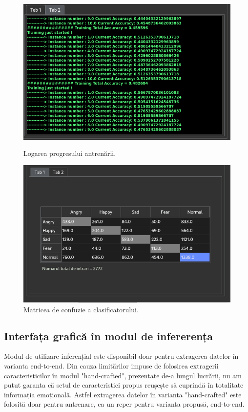 \documentclass[a4paper,12pt]{book}
\begin{document}
		\begin{figure}[h]
			\hspace{-1.2cm}
			\begin{minipage}{0.48\textwidth}
				\centering
				\includegraphics[scale=0.40]{gui_train_logs}
				\caption{Logarea progresului antrenării.}\label{Fig:gui_train_logs}
			\end{minipage}\hfill
		\hspace{1.9cm}
			\begin{minipage}{0.60\textwidth}
				\centering
				\includegraphics[scale=0.383]{gui_train_tabel}
				\caption{Matricea de confuzie a clasificatorului.}\label{Fig:gui_train_table}
			\end{minipage}
		\end{figure} 
		\subsection{Interfața grafică în modul de infererența}
		Modul de utilizare inferențial este disponibil doar pentru extragerea datelor în varianta end-to-end. Din cauza limitărilor impuse de folosirea extragerii caracteristicilor în modul "hand-crafted", prezentate de-a lungul lucrării, nu am putut garanta că setul de caracteristici propus reușește să cuprindă în totalitate informația emoțională. Astfel extragerea datelor în varianta "hand-crafted" este folosită doar pentru antrenare, ca un reper pentru varianta propusă, end-to-end. \par
		
\end{document}
